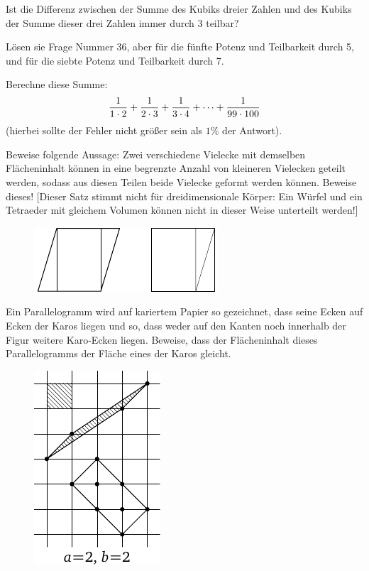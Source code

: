 \documentclass[12pt]{article} %
\begin{document}
 Ist die Differenz zwischen der Summe des Kubiks dreier Zahlen und des Kubiks der Summe dieser drei Zahlen immer durch 3 teilbar? 

\bigskip
{} Lösen sie Frage Nummer 36, aber für die fünfte Potenz und Teilbarkeit durch 5, und für die siebte Potenz und Teilbarkeit durch 7. 

\bigskip
{} Berechne diese Summe:
$${1 \over 1\cdot 2} + {1 \over 2\cdot 3} + {1 \over 3\cdot 4} + \dots + {1 \over 99\cdot 100}$$
(hierbei sollte der Fehler nicht größer sein als $1\%$ der Antwort).

\bigskip
{} Beweise folgende Aussage: Zwei verschiedene Vielecke mit demselben Flächeninhalt können in eine begrenzte Anzahl von kleineren Vielecken geteilt werden, sodass aus diesen Teilen beide Vielecke geformt werden können. Beweise dieses! [Dieser Satz stimmt nicht für dreidimensionale Körper: Ein Würfel und ein Tetraeder mit gleichem Volumen können nicht in dieser Weise unterteilt werden!]
\begin{figure}[h]
\centering
\includegraphics{q39_horizontal}\\[6pt]
\end{figure}

 Ein Parallelogramm wird auf kariertem Papier so gezeichnet, dass seine Ecken auf Ecken der Karos liegen und so, dass weder auf den Kanten noch innerhalb der Figur weitere Karo-Ecken liegen. Beweise, dass der Flächeninhalt dieses Parallelogramms der Fläche eines der Karos gleicht. 
\begin{figure}[h]
\centering
\includegraphics{taskbook-24}\vskip3pt
\end{figure}
\end{document}
